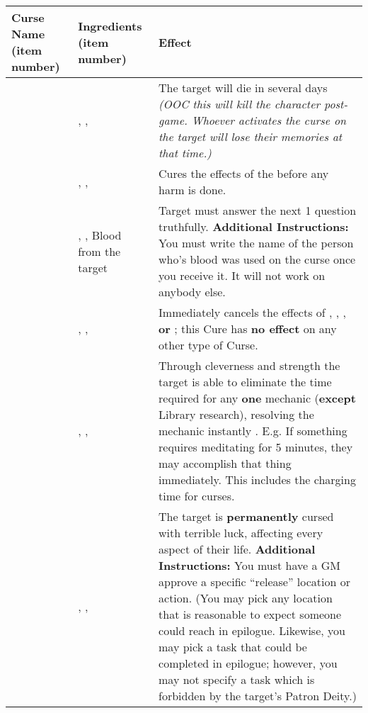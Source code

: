 \documentclass[green]{GL2020}
\begin{document}
\begin{tabularx}{\textwidth}{| >{\centering\arraybackslash} m{2.5cm} | >{\centering\arraybackslash} m{5.5cm} | X |}
\hline
	\textbf{Curse Name (item number)} & \textbf{Ingredients (item number)}  & \textbf{Effect} \\
\hline
\hline
	\iSlowActingPoison{}	&	\iWeakness{}, \iRestraint{}, \iFish{} & The target will die in several days \emph{(OOC this will kill the character post-game. Whoever activates the curse on the target will lose their memories at that time.)}\\
\hline	
	\iSlowActingPoisonCure{}	&	\iCourage{}, \iLily{}, \iStoneFlower{} & Cures the effects of the \iSlowActingPoison{} before any harm is done. \\
\hline	
	\iHonesty{}	&	\iInsight{}, \iHollyhock{}, Blood from the target & Target must answer the next 1 question truthfully. \textbf{Additional Instructions: } You must write the name of the person who's blood was used on the curse once you receive it. It will not work on anybody else.\\
\hline	
	\iSight{}	&	\iFlameOrchid{}, \iEagleFeather{}, \iHollyhock{} & Immediately cancels the effects of \iBlindness{}, \iRestraint{}, \iBabble{}, \textbf{or} \iWeakness{}; this Cure has \textbf{no effect} on any other type of Curse.\\
\hline	
	\iSkill{}	&	\iStrength{}, \iBlackCrocus{}, \iLimestone{} & Through cleverness and strength the target is able to eliminate the time required for any \textbf{one} mechanic (\textbf{except} Library research), resolving the mechanic instantly . E.g. If something requires meditating for 5 minutes, they may accomplish that thing immediately. This includes the charging time for curses.\\
\hline	
	\iBadLuckCurse{}	&	\iWeakness{}, \iBabble{}, \iCharcoal{} & The target is \textbf{permanently} cursed with terrible luck, affecting every aspect of their life. \textbf{Additional Instructions:} You must have a GM approve a specific ``release'' location or action. (You may pick any location that is reasonable to expect someone could reach in epilogue. Likewise, you may pick a task that could be completed in epilogue; however, you may not specify a task which is forbidden by the target’s Patron Deity.) \\
\hline	
\end{tabularx}
\end{document}

